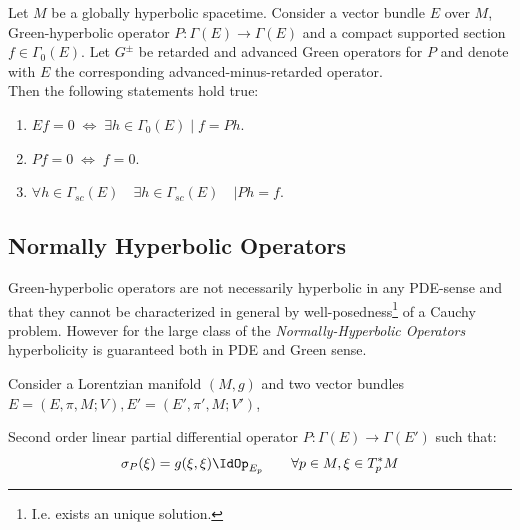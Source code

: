 \documentclass[Main]{subfiles}
\begin{document}
			
			\begin{corollary}\label{Corol:GreenKernel}
				Let $M$ be a globally hyperbolic spacetime. Consider a vector bundle $E$ over $M$, Green-hyperbolic operator $P: \Gamma(E)\rightarrow \Gamma(E)$ and a compact supported section $f\in \Gamma_{0}(E)$.
				Let $G^\pm$ be retarded and advanced Green operators for $P$ and denote with $E$ the corresponding advanced-minus-retarded operator.\\
				Then the following statements hold true:
					\begin{enumerate}
						\item $E f = 0 \; \Leftrightarrow \;  \exists h \in \Gamma_{0}(E) \; \vert \; f=P h $.
						\item $P f = 0 \; \Leftrightarrow \; f=0$.
						\item $\forall h \in \Gamma_{sc}(E)\quad \exists h \in \Gamma_{sc}(E)\quad \vert P h = f$.
					\end{enumerate}
			\end{corollary}
					
		\subsection{Normally Hyperbolic Operators}
			Green-hyperbolic operators are not necessarily hyperbolic in any PDE-sense and that they cannot be characterized in general by well-posedness\footnote{I.e. exists an unique solution.} of a Cauchy problem.
			However  for the large class of the \emph{Normally-Hyperbolic Operators} hyperbolicity is guaranteed both in PDE and Green sense.

		Consider a Lorentzian manifold $(M,g)$ and two vector bundles $E=(E,\pi,M;V), E'=(E',\pi',M;V')$,
		\begin{definition}
			Second order linear partial differential operator $P:\Gamma(E)\rightarrow \Gamma(E')$ such that:
			\begin{displaymath}
				\sigma_P(\xi) = g(\xi,\xi) \IdOp_{E_p} \qquad \forall p\in M, \xi \in T^*_pM
			\end{displaymath}
		\end{definition}
		
\end{document}
